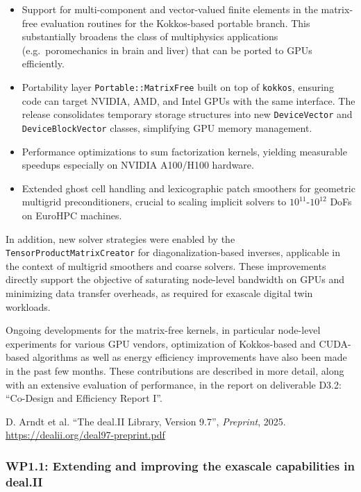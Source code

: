 \documentclass[a4paper,12pt, numbers]{article}
\begin{document}
	
	\begin{itemize}
		\item Support for multi-component and vector-valued finite elements in the
		matrix-free evaluation routines for the Kokkos-based portable branch. This substantially broadens the class
		of multiphysics applications (e.g.\ poromechanics in brain and liver)
		that can be ported to GPUs efficiently.
		\item Portability layer \texttt{Portable::MatrixFree} built on top of
		\texttt{kokkos}, ensuring code can target NVIDIA, AMD, and Intel GPUs with the
		same interface. The release consolidates temporary storage structures
		into new \texttt{DeviceVector} and \texttt{DeviceBlockVector} classes,
		simplifying GPU memory management.
		\item Performance optimizations to sum factorization kernels, yielding
		measurable speedups especially on NVIDIA A100/H100 hardware.
		\item Extended ghost cell handling and lexicographic patch smoothers for
		geometric multigrid preconditioners, crucial to scaling implicit solvers
		to $10^{11}$-$10^{12}$ DoFs on EuroHPC machines.
	\end{itemize}
	
	In addition, new solver strategies were enabled by the\\
	\texttt{TensorProductMatrixCreator} for diagonalization-based inverses,
	applicable in the context of multigrid smoothers and coarse solvers.
	These improvements directly support the objective of saturating node-level
	bandwidth on GPUs and minimizing data transfer overheads, as required for
	exascale digital twin workloads.
	
	Ongoing developments for the matrix-free kernels, in particular node-level
	experiments for various GPU vendors, optimization of Kokkos-based and
	CUDA-based algorithms as well as energy efficiency improvements have also been
	made in the past few months. These contributions are described in more detail,
	along with an extensive evaluation of performance, in the report on
	deliverable D3.2: ``Co-Design and Efficiency Report I''.
	
	\begin{thebibliography}{10}
		 D. Arndt et al. ``The deal.II Library, Version 9.7'', \emph{Preprint}, 2025. \url{https://dealii.org/deal97-preprint.pdf}
	\end{thebibliography}
	
	
	\subsubsection*{WP1.1: Extending and improving the exascale capabilities in deal.II} %
\end{document}
